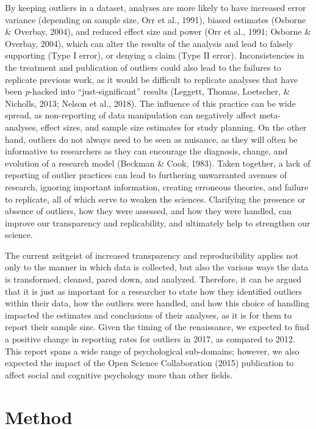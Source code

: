 \documentclass[english,man]{apa6}
\theoremstyle{definition}
\theoremstyle{definition}
\theoremstyle{definition}
\theoremstyle{remark}
\begin{document}
By keeping outliers in a dataset, analyses are more likely to have
increased error variance (depending on sample size, Orr et al., 1991),
biased estimates (Osborne \& Overbay, 2004), and reduced effect size and
power (Orr et al., 1991; Osborne \& Overbay, 2004), which can alter the
results of the analysis and lead to falsely supporting (Type I error),
or denying a claim (Type II error). Inconsistencies in the treatment and
publication of outliers could also lead to the failures to replicate
previous work, as it would be difficult to replicate analyses that have
been \emph{p}-hacked into \enquote{just-significant} results (Leggett,
Thomas, Loetscher, \& Nicholls, 2013; Nelson et al., 2018). The
influence of this practice can be wide spread, as non-reporting of data
manipulation can negatively affect meta-analyses, effect sizes, and
sample size estimates for study planning. On the other hand, outliers do
not always need to be seen as nuisance, as they will often be
informative to researchers as they can encourage the diagnosis, change,
and evolution of a research model (Beckman \& Cook, 1983). Taken
together, a lack of reporting of outlier practices can lead to
furthering unwarranted avenues of research, ignoring important
information, creating erroneous theories, and failure to replicate, all
of which serve to weaken the sciences. Clarifying the presence or
absence of outliers, how they were assessed, and how they were handled,
can improve our transparency and replicability, and ultimately help to
strengthen our science.

The current zeitgeist of increased transparency and reproducibility
applies not only to the manner in which data is collected, but also the
various ways the data is transformed, cleaned, pared down, and analyzed.
Therefore, it can be argued that it is just as important for a
researcher to state how they identified outliers within their data, how
the outliers were handled, and how this choice of handling impacted the
estimates and conclusions of their analyses, as it is for them to report
their sample size. Given the timing of the renaissance, we expected to
find a positive change in reporting rates for outliers in 2017, as
compared to 2012. This report spans a wide range of psychological
sub-domains; however, we also expected the impact of the Open Science
Collaboration (2015) publication to affect social and cognitive
psychology more than other fields.

\section{Method}\label{method}
\end{document}
